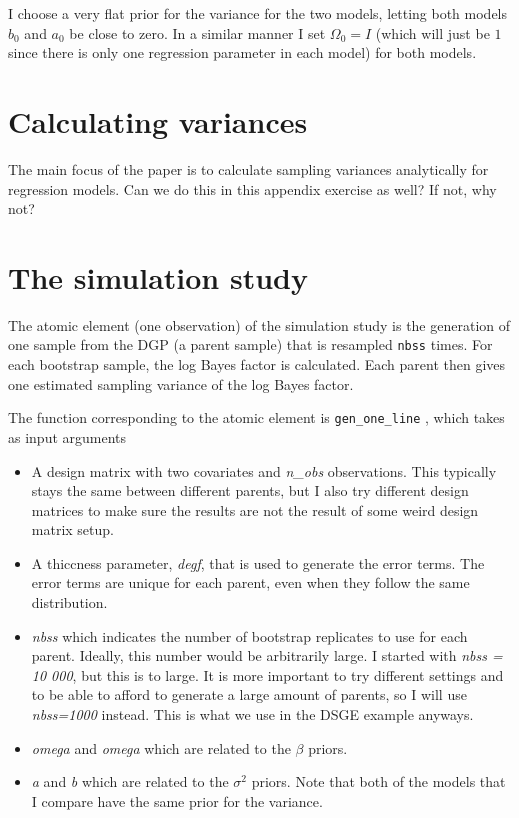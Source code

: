 \documentclass{article}
\begin{document}
I choose a very flat prior for the variance for the two models, letting both models $b_0$ and $a_0$ be close to zero. In a similar manner I set $\Omega_0=I$ (which will just be $1$ since there is only one regression parameter in each model) for both models.

\section{Calculating variances}

The main focus of the paper is to calculate sampling variances analytically for regression models. Can we do this in this appendix exercise as well? If not, why not?


\section{The simulation study}

The atomic element (one observation) of the simulation study is the generation of one sample from the DGP (a parent sample) that is resampled \texttt{n\textunderscore bss} times. For each bootstrap sample, the log Bayes factor is calculated. Each parent then gives one estimated sampling variance of the log Bayes factor.

The function corresponding to the atomic element is \texttt{gen\_one\_line} , which takes as input arguments

\begin{itemize}
    \item A design matrix with two covariates and \emph{n\_obs} observations. This typically stays the same between different parents, but I also try different design matrices to make sure the results are not the result of some weird design matrix setup.
    \item A thiccness parameter, \emph{deg\textunderscore f}, that is used to generate the error terms. The error terms are unique for each parent, even when they follow the same distribution.
    \item \emph{n\textunderscore bss} which indicates the number of bootstrap replicates to use for each parent. Ideally, this number would be arbitrarily large. I started with \emph{n\textunderscore bss = 10 000}, but this is to large. It is more important to try different settings and to be able to afford to generate a large amount of parents, so I will use \emph{n\textunderscore bss=1000} instead. This is what we use in the DSGE example anyways.
    \item \emph{omega} and \emph{omega} which are related to the $\beta$ priors.
    \item \emph{a} and \emph{b} which are related to the $\sigma^2$ priors. Note that both of the models that I compare have the same prior for the variance.
\end{itemize}
\end{document}
